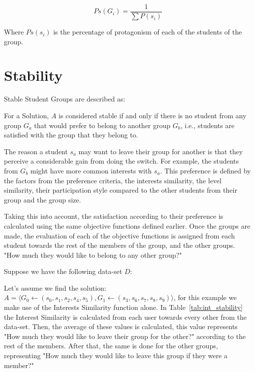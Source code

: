 \begin{equation}
    \label{eq:particiPation}
    Ps(G_i) = \frac{1}{\sum P(s_i)} 
\end{equation}

Where $Ps(s_i)$ is the percentage of protagonism of each of the students of the group. 

\section{Stability}
\label{section:stability}

Stable Student Groups are described as:

\begin{definition}
    For a Solution, $A$ is considered stable if and only if there is no student from any group $G_a$ that would prefer to belong to another group $G_b$, i.e., students are satisfied with the group that they belong to.
\end{definition}

The reason a student $s_a$ may want to leave their group for another is that they perceive a considerable gain from doing the switch. For example, the students from $G_b$ might have more common interests with $s_a$. This preference is defined by the factors from the preference criteria, the interests similarity, the level similarity, their participation style compared to the other students from their group and the group size.\

Taking this into account, the satisfaction according to their preference is calculated using the same objective functions defined earlier. Once the groups are made, the evaluation of each of the objective functions is assigned from each student towards the rest of the members of the group, and the other groups. "How much they would like to belong to any other group?"

Suppose we have the following data-set $D$: 

Let's assume we find the solution: $ A = \langle G_0 \leftarrow (s_0,s_1,s_2,s_4,s_5), G_1 \leftarrow (s_3,s_6,s_7,s_8,s_9) \rangle$, for this example we make use of the Interests Similarity function alone. In Table~\ref{tab:int_stability} the Interest Similarity is calculated from each user towards every other from the data-set. Then, the average of these values is calculated, this value represents "How much they would like to leave their group for the other?" according to the rest of the members. After that, the same is done for the other groups, representing "How much they would like to leave this group if they were a member?"\

